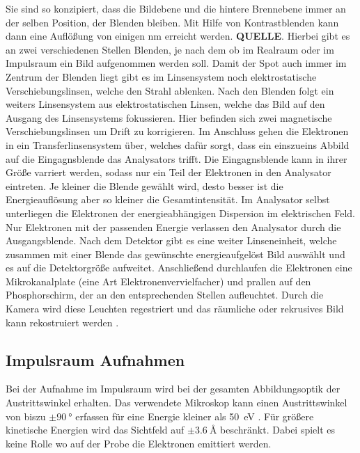         Sie sind so konzipiert, dass die Bildebene und die hintere Brennebene immer an der selben Position, der Blenden bleiben.
        Mit Hilfe von Kontrastblenden kann dann eine Auflößung von einigen \si{\nano\meter} erreicht werden. \textbf{QUELLE}.
        Hierbei gibt es an zwei verschiedenen Stellen Blenden, je nach dem ob im Realraum oder im Impulsraum ein Bild aufgenommen werden soll.
        Damit der Spot auch immer im Zentrum der Blenden liegt gibt es im Linsensystem noch elektrostatische Verschiebungslinsen, welche den Strahl ablenken.
        Nach den Blenden folgt ein weiters Linsensystem aus elektrostatischen Linsen, welche das Bild auf den Ausgang des Linsensystems fokussieren.
        Hier befinden sich zwei magnetische Verschiebungslinsen um Drift zu korrigieren.
        Im Anschluss gehen die Elektronen in ein Transferlinsensystem über, welches dafür sorgt, dass ein einszueins Abbild auf die Eingagnsblende das Analysators trifft.
        Die Eingagnsblende kann in ihrer Größe varriert werden, sodass nur ein Teil der Elektronen in den Analysator eintreten.
        Je kleiner die Blende gewählt wird, desto besser ist die Energieauflösung aber so kleiner die Gesamtintensität.
        Im Analysator selbst unterliegen die Elektronen der energieabhängigen Dispersion im elektrischen Feld. 
        Nur Elektronen mit der passenden Energie verlassen den Analysator durch die Ausgangsblende.
        Nach dem Detektor gibt es eine weiter Linseneinheit, welche zusammen mit einer Blende das gewünschte energieaufgelöst Bild auswählt und es auf die Detektorgröße aufweitet.
        Anschließend durchlaufen die Elektronen eine Mikrokanalplate (eine Art Elektronenvervielfacher) und prallen auf den Phosphorschirm, der an den entsprechenden Stellen aufleuchtet.
        Durch die Kamera wird diese Leuchten regestriert und das räumliche oder rekrusives Bild kann rekostruiert werden \cite{SPECS-MM}.

        \subsection{Impulsraum Aufnahmen}
        Bei der Aufnahme im Impulsraum wird bei der gesamten Abbildungsoptik der Austrittswinkel erhalten.
        Das verwendete Mikroskop kann einen Austrittswinkel von biszu $\pm\SI{90}{\degree}$ erfassen für eine Energie kleiner als \SI{50}{\electronvolt} \cite[page=21]{SPECS-MM}.
        Für größere kinetische Energien wird das Sichtfeld auf $\pm\SI{3.6}{\angstrom}$ beschränkt.
        Dabei spielt es keine Rolle wo auf der Probe die Elektronen emittiert werden.

